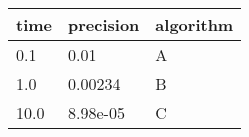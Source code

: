 \begin{longtable}[]{@{}lll@{}}
\toprule
time & precision & algorithm\tabularnewline
\midrule
\endhead
0.1 & 0.01 & A\tabularnewline
1.0 & 0.00234 & B\tabularnewline
10.0 & 8.98e-05 & C\tabularnewline
\bottomrule
\end{longtable}
